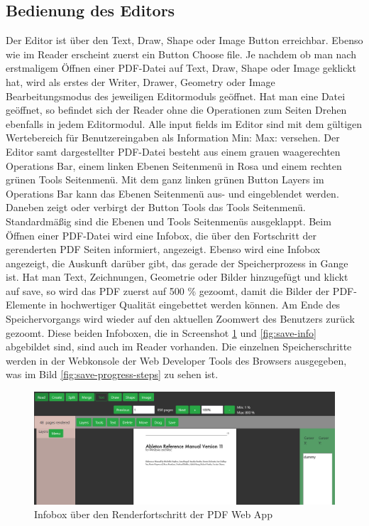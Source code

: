 \subsection{Bedienung des Editors}
Der Editor ist über den Text, Draw, Shape oder Image Button erreichbar. Ebenso wie im Reader erscheint zuerst ein Button Choose file. Je nachdem ob man nach erstmaligem Öffnen einer PDF-Datei auf Text, Draw, Shape oder Image geklickt hat, wird als erstes der Writer, Drawer, Geometry oder Image Bearbeitungsmodus des jeweiligen Editormoduls geöffnet. Hat man eine Datei geöffnet, so befindet sich der Reader ohne die Operationen zum Seiten Drehen ebenfalls in jedem Editormodul. Alle input fields im Editor sind mit dem gültigen Wertebereich für Benutzereingaben als Information Min: Max: versehen. Der Editor samt dargestellter PDF-Datei besteht aus einem grauen waagerechten Operations Bar, einem linken Ebenen Seitenmenü in Rosa und einem rechten grünen Tools Seitenmenü. Mit dem ganz linken grünen Button Layers im Operations Bar kann das Ebenen Seitenmenü aus- und eingeblendet werden. Daneben zeigt oder verbirgt der Button Tools das Tools Seitenmenü. Standardmäßig sind die Ebenen und Tools Seitenmenüs ausgeklappt. Beim Öffnen einer PDF-Datei wird eine Infobox, die über den Fortschritt der gerenderten PDF Seiten informiert, angezeigt. Ebenso wird eine Infobox angezeigt, die Auskunft darüber gibt, das gerade der Speicherprozess in Gange ist. Hat man Text, Zeichnungen, Geometrie oder Bilder hinzugefügt und klickt auf save, so wird das PDF zuerst auf 500 \% gezoomt, damit die Bilder der PDF-Elemente in hochwertiger Qualität eingebettet werden können. Am Ende des Speichervorgangs wird wieder auf den aktuellen Zoomwert des Benutzers zurück gezoomt. Diese beiden Infoboxen, die in Screenshot \ref{fig:render-info} und \ref{fig:save-info} abgebildet sind, sind auch im Reader vorhanden. Die einzelnen Speicherschritte werden in der Webkonsole der Web Developer Tools des Browsers ausgegeben, was im Bild \ref{fig:save-progress-steps} zu sehen ist.

\begin{figure}[!htbp]
	\centering
	\includegraphics[width=1\textwidth]{"images/render-info.png"}
	\caption{Infobox über den Renderfortschritt der PDF Web App}
	\label{fig:render-info}
\end{figure}

